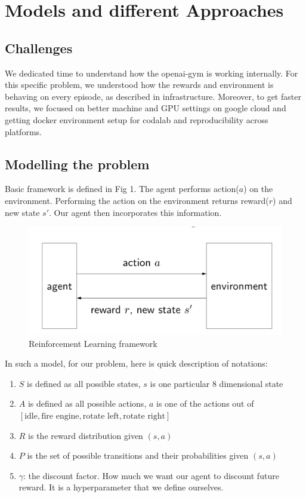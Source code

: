 \section{Models and different Approaches}
\subsection{Challenges}

We dedicated time to understand how the openai-gym is working internally. For this specific problem, we understood how the rewards and environment is behaving on every episode, as described in infrastructure. Moreover, to get faster results, we focused on better machine and GPU settings on google cloud and getting docker environment setup for codalab and reproducibility across platforms.

\subsection{Modelling the problem}

Basic framework is defined in Fig 1. The agent performs action($a$) on the environment. Performing the action on the environment returns reward($r$) and new state $s'$. Our agent then incorporates this information.

\begin{figure}%
\centering
\includegraphics[scale=0.3]{reinforcement_framework.png}%
\caption{Reinforcement Learning framework}%
\label{fig:datastats}%
\end{figure}

In such a model, for our problem, here is quick description of notations:
\begin{enumerate}
\item $S$ is defined as all possible states, $s$ is one particular 8 dimensional state
\item $A$ is defined as all possible actions, $a$ is one of the actions out of $[\text{idle}, \text{fire engine}, \text{rotate left}, \text{rotate right}]$
\item $R$ is the reward distribution given $(s, a)$
\item $P$ is the set of possible transitions and their probabilities given $(s, a)$
\item $\gamma$: the discount factor. How much we want our agent to discount future reward. It is a hyperparameter that we define ourselves.
\end{enumerate}

